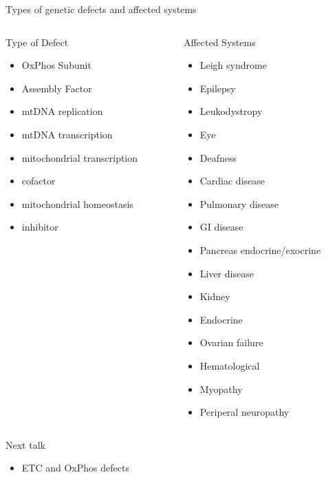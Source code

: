 \documentclass[presentation, smaller]{beamer}
\begin{document}
\begin{frame}[label={sec:org3d41367}]{Types of genetic defects and affected systems}
\begin{columns}
\begin{column}{0.5\columnwidth}
\begin{block}{Type of Defect}
\begin{itemize}
\item OxPhos Subunit
\item Assembly Factor
\item mtDNA replication
\item mtDNA transcription
\item mitochondrial transcription
\item cofactor
\item mitochondrial homeostasis
\item inhibitor
\end{itemize}
\end{block}
\end{column}

\begin{column}{0.5\columnwidth}
\small
\begin{block}{Affected Systems}
\begin{itemize}
\item Leigh syndrome
\item Epilepsy
\item Leukodystropy
\item Eye
\item Deafness
\item Cardiac disease
\item Pulmonary disease
\item GI disease
\item Pancreas endocrine/exocrine
\item Liver disease
\item Kidney
\item Endocrine
\item Ovarian failure
\item Hematological
\item Myopathy
\item Periperal neuropathy
\end{itemize}
\end{block}
\end{column}
\end{columns}
\end{frame}


\begin{frame}[label={sec:orge431c7c}]{Next talk}
\begin{itemize}
\item ETC and OxPhos defects
\end{itemize}
\end{frame}
\end{document}
